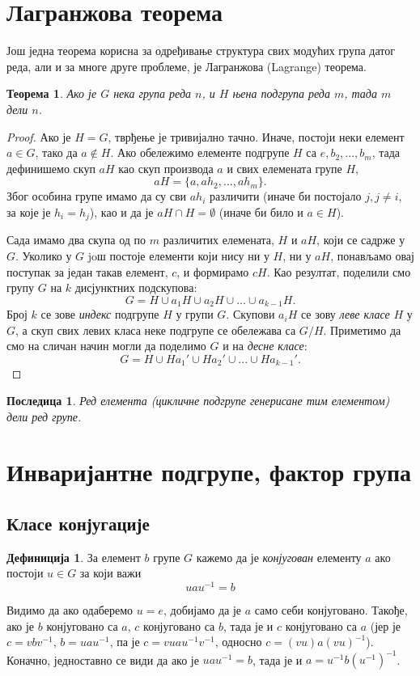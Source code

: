\documentclass{report}
\theoremstyle{plain}
\newtheorem{thm}{Теорема}
\newtheorem*{cor}{Последица}
\theoremstyle{definition}
\newtheorem{defn}{Дефиниција}
\begin{document}
\section{Лагранжова теорема}
Још једна теорема корисна за одређивање структура свих модућих група датог реда, али и за многе друге проблеме, је Лагранжова (Lagrange) теорема.
\begin{thm}
Ако је $G$ нека група реда $n$, и $H$ њена подгрупа реда $m$, тада $m$ дели $n$.
\end{thm}
\begin{proof}
Ако је $H=G$, тврђење је тривијално тачно. Иначе, постоји неки елемент $a\in G$, тако да $a\notin H$. Ако обележимо елементе подгрупе $H$ са $e, b_2, ..., b_m$, тада дефинишемо скуп $aH$ као скуп производа $a$ и свих елемената групе $H$,
$$aH = \{a, ah_2, ..., ah_m\}.$$
Због особина групе имамо да су сви $ah_i$ различити (иначе би постојало $j, j\neq i$, за које је $h_i=h_j$), као и да је $aH\cap H = \emptyset$ (иначе би било и $a\in H$).

Сада имамо два скупа од по $m$ различитих елемената, $H$ и $aH$, који се садрже у $G$. Уколико у $G$ joш постоје елементи који нису ни у $H$, ни у $aH$, понављамо овај поступак за један такав елемент, $c$, и формирамо $cH$. Као резултат, поделили смо групу $G$ на $k$ дисјунктних подскупова:
$$G = H \cup a_1 H \cup a_2 H \cup ... \cup a_{k-1} H.$$
Број $k$ се зове \emph{индекс} подгрупе $H$ у групи $G$. Скупови $a_i H$ се зову \emph{леве класе} $H$ у $G$, а скуп свих левих класа неке подгрупе се обележава са $G/H$. Приметимо да смо на сличан начин могли да поделимо $G$ и на \emph{десне класе}:
$$G = H \cup Ha_1'  \cup Ha_2' \cup ... \cup Ha_{k-1}'.$$
\end{proof}
\begin{cor}
Ред елемента (цикличне подгрупе генерисане тим елементом) дели ред групе.
\end{cor}

\section{Инваријантне подгрупе, фактор група}
\subsection{Класе конјугације}
\begin{defn}
За елемент $b$ групе $G$ кажемо да је \emph{конјугован} елементу $a$ ако постоји $u\in G$ за који важи
$$u a u^{-1} = b$$
\end{defn}
Видимо да ако одаберемо $u = e$, добијамо да је $a$ само себи конјуговано. Такође, ако је $b$ конјуговано са $a$, $c$ конјуговано са $b$, тада је и $c$ конјуговано са $a$ (јер је $c = vbv^{-1}$, $b = uau^{-1}$, па је $c = vuau^{-1}v^{-1}$, односно $c = (vu)a(vu)^{-1}$). Коначно, једноставно се види да ако је $u a u^{-1} = b$, тада је и $a = u^{-1} b (u^{-1})^{-1}$.
\end{document}

